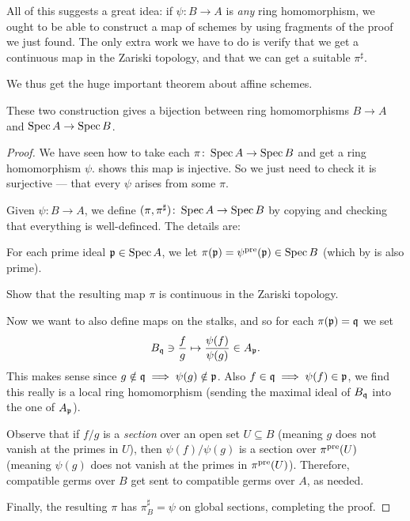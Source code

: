 All of this suggests a great idea:
if $\psi \colon B \to A$ is \emph{any} ring homomorphism,
we ought to be able to construct a map of schemes
by using fragments of the proof we just found.
The only extra work we have to do is verify that
we get a continuous map in the Zariski topology,
and that we can get a suitable $\pi^\sharp$.

We thus get the huge important theorem about affine schemes.
\begin{theorem}
	These two construction gives a bijection between
	ring homomorphisms $B \to A$ and $\operatorname{Spec} A \to \operatorname{Spec} B$.
\end{theorem}
\begin{proof}
	We have seen how to take each
	$\pi \colon \operatorname{Spec} A \to \operatorname{Spec} B$
	and get a ring homomorphism $\psi$.
	 shows this map is injective.
	So we just need to check it is surjective --- that
	every $\psi$ arises from some $\pi$.

	Given $\psi \colon B \to A$, we define
	$(\pi, \pi^\sharp) \colon \operatorname{Spec} A \to \operatorname{Spec} B$
	by copying 
	and checking that everything is well-definced.
	The details are:
	\begin{itemize}
	\ii For each prime ideal $\mathfrak p \in \operatorname{Spec} A$,
	we let $\pi(\mathfrak p) = \psi^{\text{pre}}(\mathfrak p) \in \operatorname{Spec} B$
	(which by  is also prime).
	\begin{exercise}
		Show that the resulting map $\pi$ is continuous
		in the Zariski topology.
	\end{exercise}
	\ii Now we want to also define maps on the stalks,
	and so for each $\pi(\mathfrak p) = \mathfrak q$ we set
	\[ B_\mathfrak q \ni \frac fg \mapsto \frac{\psi(f)}{\psi(g)} \in A_\mathfrak p. \]
	This makes sense since $g \notin \mathfrak q \implies \psi(g) \notin \mathfrak p$.
	Also $f \in \mathfrak q \implies \psi(f) \in \mathfrak p$,
	we find this really is a local ring homomorphism
	(sending the maximal ideal of $B_\mathfrak q$ into the one of $A_\mathfrak p$).

	Observe that if $f/g$ is a \emph{section}
	over an open set $U \subseteq B$
	(meaning $g$ does not vanish at the primes in $U$),
	then $\psi(f)/\psi(g)$ is a section over $\pi^{\text{pre}}(U)$
	(meaning $\psi(g)$ does not vanish at the primes in $\pi^{\text{pre}}(U)$).
	Therefore, compatible germs over $B$
	get sent to compatible germs over $A$, as needed.
	\end{itemize}
	Finally, the resulting $\pi$ has $\pi^\sharp_B = \psi$ on global sections,
	completing the proof.
\end{proof}

